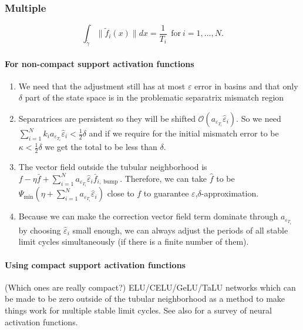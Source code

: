 \documentclass{article}
\newcommand{\ascomment}[1]{\textcolor{ascolor}{(#1)}}
\theoremstyle{definition} \newtheorem{definition}{Definition}
\theoremstyle{remark} \newtheorem{remark}{Remark}
\newcounter{ct}
\begin{document}
\subsubsection{Multiple}\label{sec:mlc_extras}
\begin{equation}\label{eq:nlc_constraints}
\int_{\tilde{\gamma}}\|\tilde{f}_i(x)\| dx = \frac{1}{T_i} \ \  \text{for} \ i=1,\dots, N. 	%
\end{equation}


\paragraph{For non-compact support activation functions}
\begin{enumerate}
\item We need that the adjustment still has at most $\varepsilon$ error in basins and that only $\delta$ part of the state space is in the problematic separatrix mismatch region
\item Separatrices are persistent so they will be shifted $\mathcal{O}(a_{\varepsilon_{T_i}}\hat \varepsilon_i)$. So we need $\sum_{i=1}^{N}k_i a_{\varepsilon_{T_i}}\hat \varepsilon_i < \tfrac{1}{2}\delta$ and if we require for the initial mismatch error to be $\kappa<\tfrac{1}{2}\delta$ we get the total to be less than $\delta$. 
\item The vector field outside the tubular neighborhood is $f - \eta\bar f  + \sum_{i=1}^Na_{\varepsilon_{T_i}}\hat \varepsilon_i\bar f_{i,\operatorname{bump}}$. 
Therefore, we can take $\hat f$ to be  $\Psi_{\min}(\eta + \sum_{i=1}^Na_{\varepsilon_{T_i}}\hat \varepsilon_i)$ close to $f$ to guarantee $\varepsilon$,$\delta$-approximation.
\item Because we can make the correction vector field term dominate through $a_{\varepsilon_{T_i}}$ by choosing $\hat \varepsilon_i$ small enough, we can always adjust the periods of all stable limit cycles simultaneously (if there is a finite number of them).
\end{enumerate}

\paragraph{Using compact support activation functions}
\ascomment{Which ones are really compact?}
 ELU/CELU/GeLU/TaLU networks\citep{clevert2015elu,barron2017celu,elfwing2018sigmoid,hasan2023talu} which can be made to be zero outside of the tubular neighborhood as a method to make things work for multiple stable limit cycles.
See also \citep{duch1999survey,dubey2022activation,jagtap2023activation,ramachandran2017activation,hayou2019activation} for a survey of neural activation functions.
\end{document}
